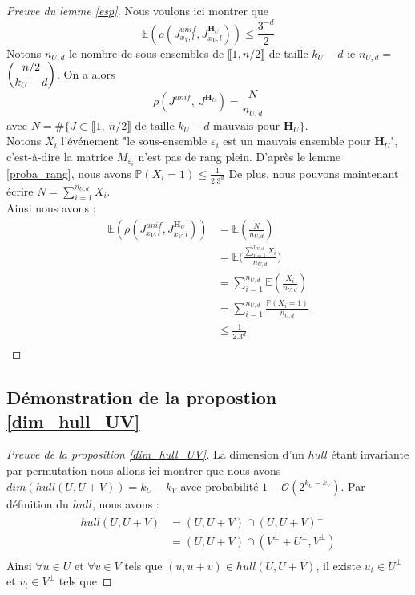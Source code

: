 \documentclass[12pt]{article}
\theoremstyle{plain}
\begin{document}
\begin{appendix}
\begin{proof}[Preuve du lemme \ref{esp}]
Nous voulons ici montrer que $$ \mathbb{E}\left(\rho\left(J_{x_V,l}^{unif},J_{x_V, l}^{\mathbf{H}_U}\right)\right) \leq \frac{3^{-d}}{2} $$
Notons $n_{U,d}$ le nombre de sous-ensembles de $\llbracket 1, n/2\rrbracket$ de taille $k_U-d$ ie \mbox{$n_{U,d} = $ {\scriptsize$\dbinom{n/2}{k_U-d}$}}. On a alors $$\rho(J^{unif},\ J^{\mathbf{H}_U}) = \frac{N}{n_{U,d}}$$ avec $N = \#\{J \subset \llbracket 1,\ n/2\rrbracket \text{ de taille } k_U - d \text{ mauvais pour } \mathbf{H}_U\}$.\\
Notons $X_i$ l'événement "le sous-ensemble $\varepsilon_i$ est un mauvais ensemble pour $\mathbf{H}_U$", c'est-à-dire la matrice $M_{\overline{\varepsilon_i}}$ n'est pas de rang plein. D'après le lemme \ref{proba_rang}, nous avons $\mathbb{P}(X_i = 1)\leq \frac{1}{2.3^d}$
De plus, nous pouvons maintenant écrire $N = \sum\limits_{i=1}^{n_{U,d}}X_i$.\\
Ainsi nous avons :
\begin{equation*}
\begin{split}
\mathbb{E}\left(\rho\left(J_{x_V,l}^{unif},J_{x_V, l}^{\mathbf{H}_U}\right)\right)  &= \mathbb{E}\left(\frac{N}{n_{U,d}}\right)  \\
&= \mathbb{E}\Bigg(\frac{\sum\limits_{i=1}^{n_{U,d}}X_i}{n_{U,d}}\Bigg)\\
&= \sum\limits_{i=1}^{n_{U,d}}\mathbb{E}\left(\frac{X_i}{n_{U,d}}\right)\\
&= \sum\limits_{i=1}^{n_{U,d}}\frac{\mathbb{P}(X_i = 1)}{n_{U,d}}\\
&\leq \frac{1}{2.3^d}\\
\end{split}
\end{equation*}
\end{proof}

\subsection*{Démonstration de la propostion \ref{dim_hull_UV}}
\begin{proof}[Preuve de la proposition \ref{dim_hull_UV}]
La dimension d'un $hull$ étant invariante par permutation nous allons ici montrer que nous avons $dim(hull(U,U+V)) = k_U - k_V$ avec probabilité $1-\mathcal{O}(2^{k_U-k_V})$.
Par définition du $hull$, nous avons :
\begin{equation*}
\begin{split}
hull(U,U+V) &= (U,U+V) \cap (U,U+V)^{\bot } \\
&= (U,U+V) \cap (V^{\bot}+U^{\bot}, V^{\bot}) \\
\end{split}
\end{equation*} 
Ainsi $\forall u\in U$ et $\forall v\in V$ tels que $(u,u+v)\in hull(U,U+V)$, il existe $u_t\in U^{\bot}$ et $v_t\in V^{\bot}$ tels que


\end{proof}
\end{appendix}
\end{document}
